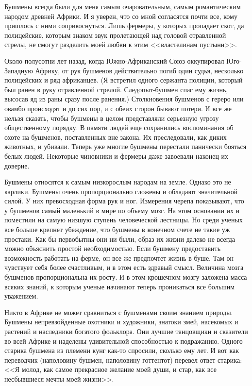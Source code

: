\documentclass[12pt,a4paper,twoside,openany,svgnames]{memoir}
\begin{document}
Бушмены всегда были для меня самым очаровательным, самым романтическим народом древней Африки. И я уверен, что со мной согласятся почти все, кому пришлось с ними соприкоснуться. Лишь фермеры, у которых пропадает скот, да полицейские, которым знаком звук пролетающей над головой отравленной стрелы, не смогут разделить моей любви к этим <<властелинам пустыни>>.

Около полусотни лет назад, когда Южно-Африканский Союз оккупировал Юго-Западную Африку, от рук бушменов действительно погиб один судья, несколько полицейских и ряд африканцев. (Я встретил одного сержанта полиции, который был ранен в руку отравленной стрелой. Следопыт-бушмен спас ему жизнь, высосав яд из раны сразу после ранения.) Столкновения бушменов с гереро или овамбо происходят и до сих пор, и с обеих сторон бывают потери. И все же нельзя сказать, чтобы бушмены в целом представляли серьезную угрозу общественному порядку. В памяти людей еще сохранились воспоминания об охоте на бушменов, поставленных вне закона. Их преследовали, как диких животных, и убивали. Теперь уже многие бушмены перестали панически бояться белых людей. Некоторые чиновники и фермеры даже завоевали наконец их доверие.

Бушмены относятся к самым низкорослым народам на земле. Однако это не карлики. Бушмены очень пропорционально сложены и обладают значительной силой. У них превосходная форма рук и ног. Измерения черепа показывают, что у бушменов самый маленький в мире по объему мозг. На этом основании их и поместили на самую низшую ступень человеческой лестницы. Но среди ученых все больше крепнет убеждение, что бушмены в конечном счете не такие уж простаки. Как бы первобытны они ни были, образ их жизни далеко не всегда можно объяснить простой необходимостью. Если бушмену предоставить возможность работать на ферме, он все же предпочтет жизнь в буше. Там он чувствует себя более счастливым, и в этом есть здравый смысл. Величина мозга бушменов пропорциональна их росту. И в этом крошечном мозгу заложена масса всяких знаний, к которым ученые начинают теперь проникаться все большим уважением.

Никто в Африке не может сравниться с бушменами своим знанием природы. Бушмены непревзойденные охотники и художники, знатоки змей, насекомых и растений и наследники богатого фольклора. Они лучшие танцовщики и сказители во всей Африке и наделены удивительной способностью к подражанию. Одного старика бушмена из племени кунг как-то спросили, сколько ему лет. И вот как переводчик (наполовину бушмен, наполовину готтентот) перевел ответ старика: <<Я молод, как самое прекрасное желание моей души, и стар, как все несбывшиеся мечты моей жизни>>.
\end{document}

